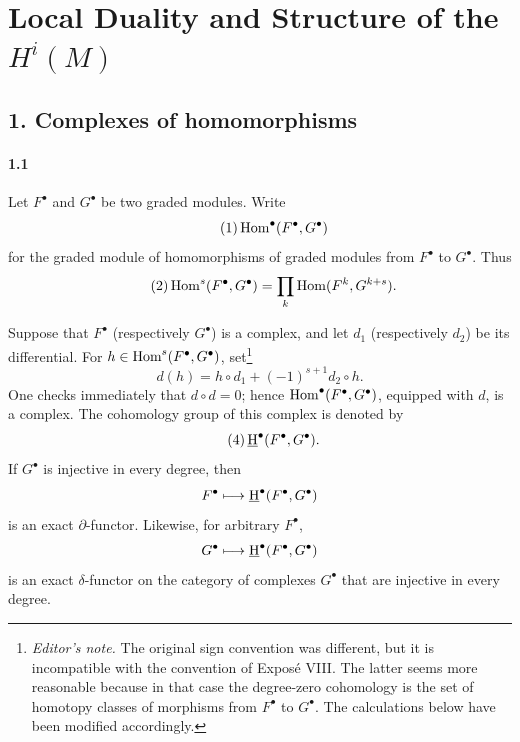 \makeatletter
\providecommand{\sgareaderlabel}[2]{%
  \begingroup
  \def\@currentlabel{#2}%
  \phantomsection\label{#1}%
  \endgroup}
\makeatother

\chapter{Local Duality and Structure of the $H^i(M)$}
\label{V}

\section*{1. Complexes of homomorphisms}
\sgareaderlabel{V.1}{1}

\subsubsection*{1.1}
\sgareaderlabel{V.1.1}{1.1}

Let $F^{\bullet}$ and $G^{\bullet}$ be two graded modules. Write
\begin{equation}\tag{1}\label{eq:V.1}
  \operatorname{Hom}^{\bullet}(F^{\bullet},G^{\bullet})
\end{equation}
for the graded module of homomorphisms of graded modules from $F^{\bullet}$
to $G^{\bullet}$. Thus
\begin{equation}\tag{2}\label{eq:V.2}
  \operatorname{Hom}^{s}(F^{\bullet},G^{\bullet})
    =\prod_k \operatorname{Hom}(F^k,G^{k+s}).
\end{equation}

Suppose that $F^{\bullet}$ (respectively $G^{\bullet}$) is a complex, and let
$d_1$ (respectively $d_2$) be its differential. For
$h\in\operatorname{Hom}^s(F^{\bullet},G^{\bullet})$, set\footnote{\textit{Editor's note.}
The original sign convention was different, but it is incompatible with the
convention of Expos\'e VIII. The latter seems more reasonable because in that
case the degree-zero cohomology is the set of homotopy classes of morphisms
from $F^{\bullet}$ to $G^{\bullet}$. The calculations below have been modified
accordingly.}
\begin{equation}\tag{3}\label{eq:V.3}
  d(h)=h\circ d_1+(-1)^{s+1}d_2\circ h.
\end{equation}
One checks immediately that $d\circ d=0$; hence
$\operatorname{Hom}^{\bullet}(F^{\bullet},G^{\bullet})$, equipped with $d$, is a complex.
The cohomology group of this complex is denoted by
\begin{equation}\tag{4}\label{eq:V.4}
  \mathop{\underline{\mathrm H}}\nolimits^{\bullet}(F^{\bullet},G^{\bullet}).
\end{equation}
If $G^{\bullet}$ is injective in every degree, then
\[
  F^{\bullet}\longmapsto
  \mathop{\underline{\mathrm H}}\nolimits^{\bullet}(F^{\bullet},G^{\bullet})
\]
is an exact $\partial$-functor. Likewise, for arbitrary $F^{\bullet}$,
\[
  G^{\bullet}\longmapsto
  \mathop{\underline{\mathrm H}}\nolimits^{\bullet}(F^{\bullet},G^{\bullet})
\]
is an exact $\delta$-functor on the category of complexes $G^{\bullet}$ that
are injective in every degree.

